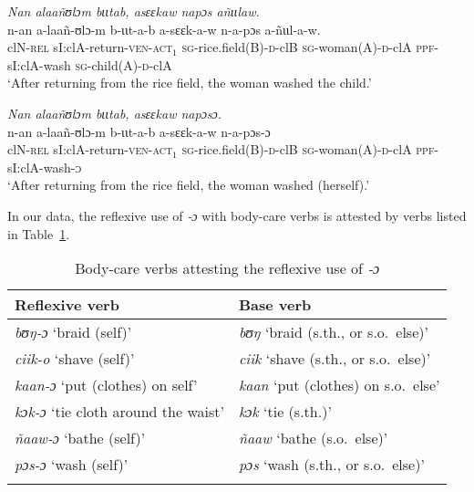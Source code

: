 \documentclass[output=paper]{langscibook}
\begin{document}
\ea
  \label{ex:Creissels:38}
    \ea \label{ex:Creissels:38a}
      \textit{Nan alaañʊlɔm bɩɩtab, asɛɛkaw napɔs añɩɩlaw.}\\
      \gll n-an a-laañ-ʊlɔ-m b-ɩɩt-a-b a-sɛɛk-a-w n-a-pɔs a-ñɩɩl-a-w.\\
      clN-\textsc{rel} sI:clA-return-\textsc{ven-act$_1$} \textsc{sg}-rice.field(B)-\textsc{d}-clB \textsc{sg}-woman(A)-\textsc{d}-clA \textsc{ppf}-sI:clA-wash \textsc{sg}-child(A)-\textsc{d}-clA \\
      \glt `After returning from the rice field, the woman washed the child.'


    \ex \label{ex:Creissels:38b}
      \textit{Nan alaañʊlɔm bɩɩtab, asɛɛkaw napɔsɔ.}\\
      \gll n-an a-laañ-ʊlɔ-m b-ɩɩt-a-b a-sɛɛk-a-w n-a-pɔs-ɔ\\
      clN-\textsc{rel} sI:clA-return-\textsc{ven-act$_1$} \textsc{sg}-rice.field(B)-\textsc{d}-clB \textsc{sg}-woman(A)-\textsc{d}-clA \textsc{ppf}-sI:clA-wash-\textsc{ɔ}\\
      \glt `After returning from the rice field, the woman washed (herself).'
  \z
\z

In our data, the reflexive use of \textit{‑ɔ} with body-care verbs is attested by
verbs listed in Table~\ref{tab:Creissels:o-verbs}.

\begin{table}[ht]
  \centering
  \begin{tabular}{ll}
    \lsptoprule
    {Reflexive verb} & {Base verb} \\
    \hline
    \textit{bʊŋ-ɔ} `braid (self)' & \textit{bʊŋ} `braid (s.th., or s.o.\ else)' \\
    \textit{ciik-o} `shave (self)' & \textit{ciik} `shave (s.th., or s.o.\ else)' \\
    \textit{kaan-ɔ} `put (clothes) on self' & \textit{kaan} `put (clothes) on s.o.\ else' \\
    \textit{kɔk-ɔ} `tie cloth around the waist' & \textit{kɔk} `tie (s.th.)' \\
    \textit{ñaaw-ɔ} `bathe (self)' & \textit{ñaaw} `bathe (s.o.\ else)' \\
    \textit{pɔs-ɔ} `wash (self)' & \textit{pɔs} `wash (s.th., or s.o.\ else)' \\
    \lspbottomrule
  \end{tabular}
  \caption{Body-care verbs attesting the reflexive use of \textit{‑ɔ}}%
  \label{tab:Creissels:o-verbs}
\end{table}
\end{document}

